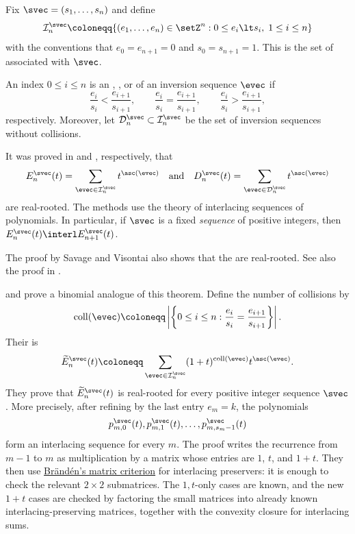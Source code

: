\begin{example*}
Fix $\svec = (s_1,\dotsc,s_n)$ and define
\[
\mathcal{I}_n^\svec \coloneqq
\{ (e_1,\dotsc,e_n) \in \setZ^n : 0 \leq e_i \lt s_i,\; 1 \leq i \leq n \}
\]
with the conventions that $e_0 = e_{n+1} =0$ and $s_0 = s_{n+1}=1$.
This is the set of
\label{inversionSequence} associated with $\svec$.

An index $0 \leq i \leq n$ is an
\label{inversionSequenceAscent},
\label{inversionSequenceCollision}, or
\label{inversionSequenceDescent}
of an inversion sequence $\evec$ if
\[
 \frac{e_i}{s_i} \lt \frac{e_{i+1}}{s_{i+1}}, \qquad
 \frac{e_i}{s_i} = \frac{e_{i+1}}{s_{i+1}}, \qquad
 \frac{e_i}{s_i} \gt \frac{e_{i+1}}{s_{i+1}},
\]
respectively. Moreover, let $\mathcal{D}_n^\svec \subset \mathcal{I}_n^\svec$
be the set of inversion sequences without collisions.

It was proved in \cite{SavageVisontai2015} and
\cite{GustafssonSolus2020}, respectively, that
\[
E^\svec_n(t) = \sum_{\evec \in \mathcal{I}_n^\svec} t^{\asc(\evec)} \quad \text{and} \quad
D^\svec_n(t) = \sum_{\evec \in \mathcal{D}_n^\svec} t^{\asc(\evec)}
\]
are real-rooted. The methods use the theory of interlacing sequences of polynomials.
In particular, if $\svec$ is a fixed \emph{sequence} of positive integers,
then $E^\svec_n(t) \interl E^\svec_{n+1}(t)$.

The proof by Savage and Visontai also shows that the
\label{sEulerianPolynomial}
are real-rooted.  See also the proof in
\cite[Sec.~8.2]{Branden2015}.

 and 
\cite{HaglundZhang2019} prove a binomial analogue of this theorem.
Define the number of collisions by
\[
  \operatorname{coll}(\evec)
  \coloneqq
  \left|\left\{0\leq i\leq n :
  \frac{e_i}{s_i}=\frac{e_{i+1}}{s_{i+1}}\right\}\right|.
\]
Their 
\label{binomialSEulerianPolynomial} is
\[
  \widetilde{E}_n^\svec(t)
  \coloneqq
  \sum_{\evec\in\mathcal{I}_n^\svec}
  (1+t)^{\operatorname{coll}(\evec)} t^{\asc(\evec)}.
\]
They prove that \(\widetilde{E}_n^\svec(t)\) is real-rooted for every
positive integer sequence \(\svec\).  More precisely, after refining by the
last entry \(e_m=k\), the polynomials
\[
  p_{m,0}^\svec(t),p_{m,1}^\svec(t),\dotsc,p_{m,s_m-1}^\svec(t)
\]
form an interlacing sequence for every \(m\).
The proof writes the recurrence from \(m-1\) to \(m\) as multiplication by a
matrix whose entries are \(1\), \(t\), and \(1+t\).  They then use
\hyperref[realMatrixRecursion]{Brändén's matrix criterion} for interlacing
preservers: it is enough to check the relevant \(2\times2\) submatrices.
The \(1,t\)-only cases are known, and the new \(1+t\) cases are checked by
factoring the small matrices into already known interlacing-preserving
matrices, together with the convexity closure for interlacing sums.
\end{example*}



